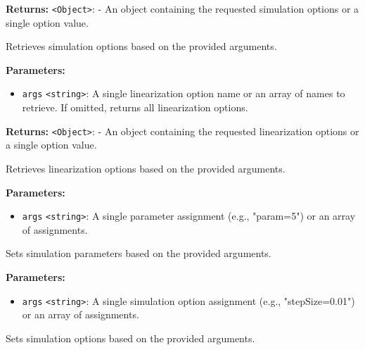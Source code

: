 \documentclass[12pt,a4paper]{article}
\begin{document}
\noindent \textbf{Returns:} \texttt{<Object>}: - An object containing the requested simulation options or a single option value.

\noindent Retrieves simulation options based on the provided arguments.

\vspace{5mm}
\noindent {}


\noindent \textbf{Parameters:}
\begin{itemize}
  \item \texttt{args} \texttt{<string>}: A single linearization option name or an array of names to retrieve. If omitted, returns all linearization options.
\end{itemize}

\noindent \textbf{Returns:} \texttt{<Object>}: - An object containing the requested linearization options or a single option value.

\noindent Retrieves linearization options based on the provided arguments.

\vspace{5mm}
\noindent {}


\noindent \textbf{Parameters:}
\begin{itemize}
  \item \texttt{args} \texttt{<string>}: A single parameter assignment (e.g., "param=5") or an array of assignments.
\end{itemize}

\noindent Sets simulation parameters based on the provided arguments.

\vspace{5mm}
\noindent {}


\noindent \textbf{Parameters:}
\begin{itemize}
  \item \texttt{args} \texttt{<string>}: A single simulation option assignment (e.g., "stepSize=0.01") or an array of assignments.
\end{itemize}

\noindent Sets simulation options based on the provided arguments.
\end{document}
